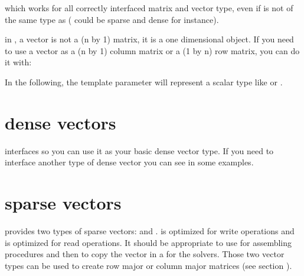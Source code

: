 \documentclass[a4paper,11pt,english]{sphinxmanual}
\begin{document}
\sphinxAtStartPar
which works for all correctly interfaced matrix and vector type, even if  is not of the same type as  ( could be sparse and  dense for instance).

\sphinxAtStartPar
in , a vector is not a (n by 1) matrix, it is a one dimensional object. If you need to use a vector as a (n by 1) column matrix or a (1 by n) row matrix, you can do it with:

\begin{sphinxVerbatim}[commandchars=\\\{\}]
 
 
\end{sphinxVerbatim}

\sphinxAtStartPar
In the following, the template parameter  will represent a scalar type like  or .


\section{dense vectors}
\label{\detokenize{gmm/matrix:dense-vectors}}
\sphinxAtStartPar
{} interfaces  so you can use it as your basic dense vector type.
If you need to interface another type of dense vector you can see in 
some examples.


\section{sparse vectors}
\label{\detokenize{gmm/matrix:sparse-vectors}}
\sphinxAtStartPar
{} provides two types of sparse vectors:  and .  is optimized for write operations and  is optimized for read operations. It should be appropriate to use  for assembling procedures and then to copy the vector in a  for the solvers. Those two vector types can be used to create row major or column major matrices (see section  {\hyperref[\detokenize{gmm/matrix:gmmracmat}]{}}).
\end{document}
